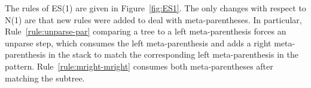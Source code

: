 \documentclass{sigplanconf}
\begin{document}
The rules of ES(1) are given in Figure~\ref{fig:ES1}. The only changes
with respect to N(1) are that new rules were added to deal with
meta-parentheses. In particular, Rule~\ref{rule:unparse-par} comparing
a tree to a left meta-parenthesis forces an unparse step, which
consumes the left meta-parenthesis and adds a right meta-parenthesis
in the stack to match the corresponding left meta-parenthesis in the
pattern. Rule~\ref{rule:mright-mright} consumes both meta-parentheses
after matching the subtree.

\end{document}
